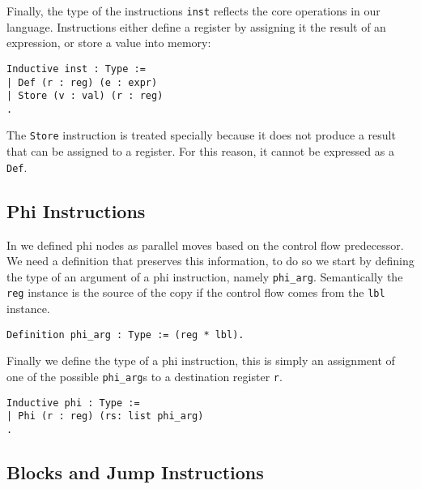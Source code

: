 Finally, the type of the instructions \texttt{inst} reflects the core operations in our language. Instructions either define a register by assigning it the result of an expression, or store a value into memory:

\begin{lstlisting}[language=Coq]
Inductive inst : Type :=
| Def (r : reg) (e : expr)
| Store (v : val) (r : reg)
.
\end{lstlisting}

The \texttt{Store} instruction is treated specially because it does not produce a result that can be assigned to a register. For this reason, it cannot be expressed as a \texttt{Def}.

\subsection{Phi Instructions}

In  we defined phi nodes as parallel moves based on the control flow predecessor.
We need a definition that preserves this information, to do so we start by defining the type of an argument of a phi instruction, namely \texttt{phi\_arg}. Semantically the \texttt{reg} instance is the source of the copy if the control flow comes from the \texttt{lbl} instance.

\begin{lstlisting}[language=Coq]
Definition phi_arg : Type := (reg * lbl).
\end{lstlisting}

Finally we define the type of a phi instruction, this is simply an assignment of one of the possible \texttt{phi\_arg}s to a destination register \texttt{r}.

\begin{lstlisting}[language=Coq]
Inductive phi : Type :=
| Phi (r : reg) (rs: list phi_arg)
.
\end{lstlisting}


\subsection{Blocks and Jump Instructions}

